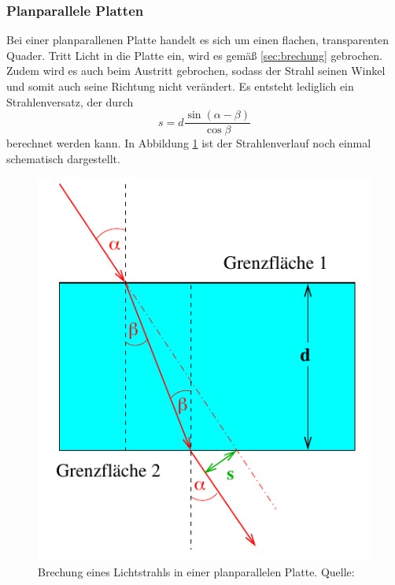 \subsubsection*{Planparallele Platten}
\label{sec:platten}
Bei einer planparallenen Platte handelt es sich um einen flachen, transparenten Quader. Tritt Licht in die Platte ein, wird
es gemäß \ref{sec:brechung} gebrochen. Zudem wird es auch beim Austritt gebrochen, sodass der Strahl seinen Winkel und
somit auch seine Richtung nicht verändert. Es entsteht lediglich ein Strahlenversatz, der durch
\begin{equation}
    s=d\frac{\sin(\alpha-\beta)}{\cos\beta}
    \label{eqn:strahlenversatz}
\end{equation}
berechnet werden kann. In Abbildung \ref{fig:platten} ist der Strahlenverlauf noch einmal schematisch dargestellt.
\begin{figure}[H]
    \centering
    \includegraphics[scale = 0.5]{pictures/Platte.png}
    \caption{Brechung eines Lichtstrahls in einer planparallelen Platte. Quelle: \cite{AP01}}
    \label{fig:platten}
\end{figure}

